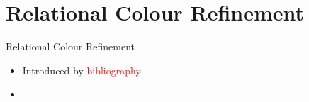 \documentclass{beamer}
\begin{document}
	\section{Relational Colour Refinement}
	
	\begin{frame}{Relational Colour Refinement}
		\begin{itemize}
			\item Introduced by \textcolor{red}{bibliography}
			\item 
		\end{itemize}
	\end{frame}
	
	
\end{document}
